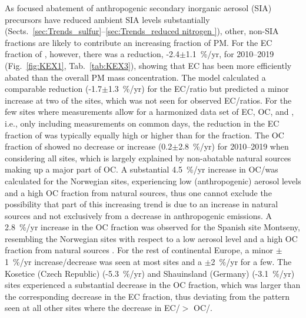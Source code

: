 As focused abatement of anthropogenic secondary inorganic aerosol (SIA)
precursors have reduced ambient SIA levels substantially (Sects.~\ref{sec:Trends_sulfur}--\ref{sec:Trends_reduced nitrogen }), 
other, non-SIA fractions are likely to contribute an increasing fraction
of PM. For the EC fraction of \pmfine, however, there was a reduction,  -2.4$\pm$1.1~\%/yr, 
for 2010--2019 (Fig.~\ref{fig:KEX1}, Tab.~\ref{tab:KEX3}), showing that EC has been
more efficiently abated than the overall PM mass concentration. The model
calculated a comparable reduction (-1.7$\pm$1.3~\%/yr) for the EC/\pmfine ratio
but predicted a minor increase at two of the sites, which was not seen for
observed EC/\pmfine ratios. For the few sites where measurements allow for
a harmonized data set of EC, OC,  and \pmfine, i.e., only including
measurements on common days, the reduction in the EC fraction of \pmfine
was typically equally high or higher than for the  fraction. The
OC fraction of \pmfine showed no decrease or increase (0.2$\pm$2.8~\%/yr)
for 2010--2019 when considering all sites, which is largely explained by
non-abatable natural sources making up a major part of OC. A substantial
4.5~\%/yr increase in OC/\pmfine was calculated for the Norwegian sites,
experiencing low (anthropogenic) aerosol levels and a high OC fraction
from natural sources, thus one cannot exclude the possibility that part
of this increasing trend is due to an increase in natural sources and
not exclusively from a decrease in anthropogenic emissions. A 2.8~\%/yr
increase in the OC fraction was observed for the Spanish site Montseny,
resembling the Norwegian sites with respect to a low aerosol level and
a high OC fraction from natural sources \citep{Kulmala2011,Crippa2014}. For the
rest of continental Europe, a minor $\pm$1~\%/yr increase/decrease
was seen at most sites and a $\pm$2~\%/yr for a few. The Kosetice
(Czech Republic) (-5.3~\%/yr) and Shauinsland (Germany) (-3.1~\%/yr) sites
experienced a substantial decrease in the OC fraction, which was larger
than the corresponding decrease in the EC fraction, thus deviating from
the pattern seen at all other sites where the decrease in EC/\pmfine $>$
OC/\pmfine.

